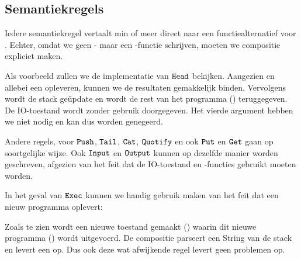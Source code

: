 \subsection{Semantiekregels}
\label{sec:cleansmurf:regels}
Iedere semantiekregel vertaalt min of meer direct naar een functiealternatief
voor . Echter, omdat we geen - maar een -functie
schrijven, moeten we compositie expliciet maken.

Als voorbeeld zullen we de implementatie van $\texttt{Head}$ bekijken. Aangezien
 en  allebei een  opleveren, kunnen we de resultaten
gemakkelijk binden. Vervolgens wordt de stack geüpdate en wordt de rest van het
programma () teruggegeven. De IO-toestand wordt zonder gebruik
doorgegeven. Het vierde argument hebben we niet nodig en kan dus worden
genegeerd.



Andere regels, voor $\texttt{Push}$, $\texttt{Tail}$, $\texttt{Cat}$, $\texttt{Quotify}$ en ook
$\texttt{Put}$ en $\texttt{Get}$ gaan op soortgelijke wijze. Ook $\texttt{Input}$ en
$\texttt{Output}$ kunnen op dezelfde manier worden geschreven, afgezien van het feit
dat de IO-toestand en -functies gebruikt moeten worden.

In het geval van $\texttt{Exec}$ kunnen we handig gebruik maken van het feit dat
 een nieuw programma oplevert:



Zoals te zien wordt een nieuwe toestand gemaakt () waarin dit nieuwe
programma () wordt uitgevoerd. De compositie 
parseert een String van de stack en levert een  op. Dus ook
deze wat afwijkende regel levert geen problemen op.
